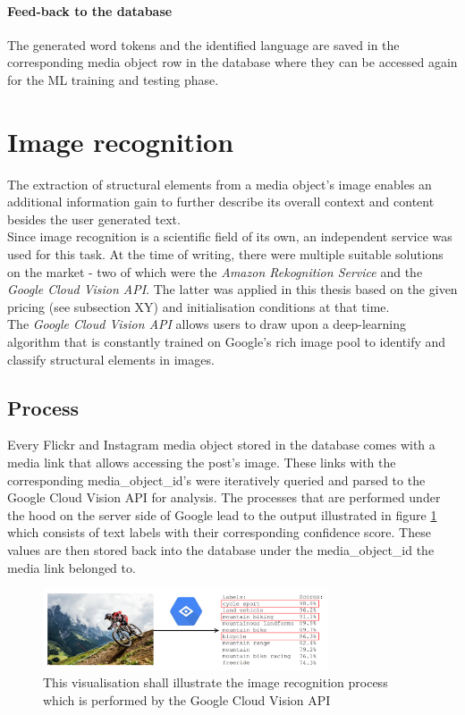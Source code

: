 \paragraph{Feed-back to the database}
The generated word tokens and the identified language are saved in the corresponding media object row in the database where they can be accessed again for the ML training and testing phase.

\section{Image recognition} \label{image_recognition}
The extraction of structural elements from a media object's image enables an additional information gain to further describe its overall context and content besides the user generated text.\\
\newline
Since image recognition is a scientific field of its own, an independent service was used for this task. At the time of writing, there were multiple suitable solutions on the market - two of which were the \textit{Amazon Rekognition Service} and the \textit{Google Cloud Vision API}. The latter was applied in this thesis based on the given pricing (see subsection XY) and initialisation conditions at that time.\\
The \textit{Google Cloud Vision API} allows users to draw upon a deep-learning algorithm that is constantly trained on Google's rich image pool to identify and classify structural elements in images.

\subsection{Process}
Every Flickr and Instagram media object stored in the database comes with a media link that allows accessing the post's image. 
These links with the corresponding media\_object\_id's were iteratively queried and parsed to the Google Cloud Vision API for analysis. The processes that are performed under the hood on the server side of Google lead to the output illustrated in figure \ref{fig:vision_illustration} which consists of text labels with their corresponding confidence score. These values are then stored back into the database under the media\_object\_id the media link belonged to.

\begin{figure}[h]
   \centering
   \includegraphics[width=0.75\textwidth]{img/vision_illustration}
   \caption{This visualisation shall illustrate the image recognition process which is performed by the Google Cloud Vision API \parencite{Allaboutlimassol2015}}
   \label{fig:vision_illustration}
\end{figure}

